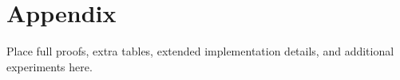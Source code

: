 \section{Appendix}

Place full proofs, extra tables, extended implementation details, and
additional experiments here.
